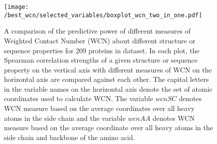 \documentclass[11pt]{article}
\begin{document}
    \begin{figure}[tbh]
        \begin{center}
        \texttt{[image: /best\_wcn/selected\_variables/boxplot\_wcn\_two\_in\_one.pdf]}
        \end{center}
        \caption{A comparison of the predictive power of different measures of Weighted Contact Number (WCN) about different structure or sequence properties for 209 proteins in dataset. In each plot, the Spearman correlation strengths of a given structure or sequence property on the vertical axis with different measures of WCN on the horizontal axis are compared against each other. The capital letters in the variable names on the horizontal axis denote the set of atomic coordinates used to calculate WCN. The variable $wcnSC$ denotes WCN measure based on the average coordinates over all heavy atoms in the side chain and the variable $wcnAA$ denotes WCN measure based on the average coordinate over all heavy atoms in the side chain and backbone of the amino acid.}
        \label{fig:best_wcn}
    \end{figure}



\end{document}
